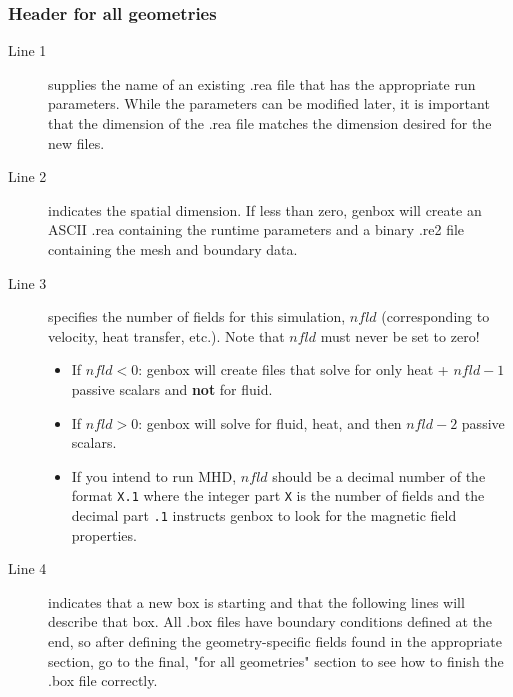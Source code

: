 \subsubsection{Header for all geometries}

\begin{description}

  \item[Line 1] supplies the name of an existing .rea file that has the
    appropriate run parameters.  While the parameters can be modified later, it
    is important that the dimension of the .rea file matches the dimension
    desired for the new files.

  \item[Line 2] indicates the spatial dimension. If less than zero, genbox will
    create an ASCII .rea containing the runtime parameters and a binary .re2
    file containing the mesh and boundary data.

  \item[Line 3] specifies the number of fields for this simulation, $nfld$
    (corresponding to velocity, heat transfer, etc.). Note that $nfld$ must
    never be set to zero!

    \begin{itemize}

      \item If $nfld<0$: genbox will create files that solve for only heat +
        $nfld-1$ passive scalars and \textbf{not} for fluid. 

      \item If $nfld>0$: genbox will solve for fluid, heat, and then $nfld-2$
        passive scalars.   
    
      \item If you intend to run MHD, $nfld$ should be a decimal number of the
        format \texttt{X.1} where the integer part \texttt{X} is the number of
        fields and the decimal part \texttt{.1} instructs genbox to look for
        the magnetic field properties.

    \end{itemize}

  \item[Line 4] indicates that a new box is starting and that the following
    lines will describe that box.  All .box files have boundary conditions
    defined at the end, so after defining the geometry-specific fields found in
    the appropriate section, go to the final, "for all geometries" section to
    see how to finish the .box file correctly.


\end{description}

